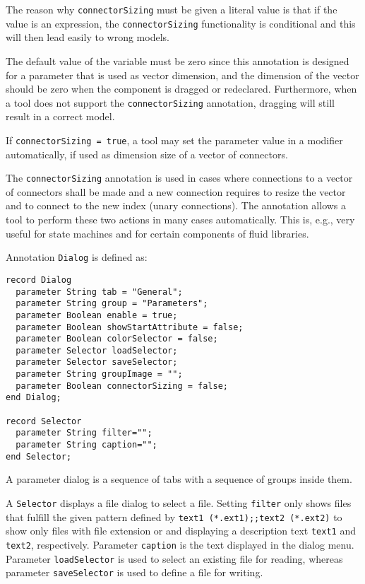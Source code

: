 \begin{nonnormative}
The reason why \lstinline!connectorSizing! must be given a literal value is that if the value is an expression,
the \lstinline!connectorSizing! functionality is conditional and this will then lead easily to wrong models.

The default value of the variable must be zero since this annotation
is designed for a parameter that is used as vector dimension, and the
dimension of the vector should be zero when the component is dragged or
redeclared.  Furthermore, when a tool does not support the
\lstinline!connectorSizing! annotation, dragging will still result in a correct
model.
\end{nonnormative}

If \lstinline!connectorSizing = true!, a tool may set the parameter value
in a modifier automatically, if used as dimension size of a vector of
connectors.

\begin{nonnormative}
The \lstinline!connectorSizing! annotation is used in cases
where connections to a vector of connectors shall be made and a new
connection requires to resize the vector and to connect to the new index
(unary connections). The annotation allows a tool to perform these two
actions in many cases automatically. This is, e.g., very useful for
state machines and for certain components of fluid libraries.
\end{nonnormative}

Annotation \lstinline!Dialog! is defined as:
\begin{lstlisting}[language=modelica]
record Dialog
  parameter String tab = "General";
  parameter String group = "Parameters";
  parameter Boolean enable = true;
  parameter Boolean showStartAttribute = false;
  parameter Boolean colorSelector = false;
  parameter Selector loadSelector;
  parameter Selector saveSelector;
  parameter String groupImage = "";
  parameter Boolean connectorSizing = false;
end Dialog;

record Selector
  parameter String filter="";
  parameter String caption="";
end Selector;
\end{lstlisting}
A parameter dialog is a sequence of tabs with a sequence of groups
inside them.

A \lstinline!Selector! displays a file dialog to select a file. Setting \lstinline!filter! only
shows files that fulfill the given pattern defined by \lstinline!text1 (*.ext1);;text2 (*.ext2)! to show only files with file extension
 or  and displaying a description text \lstinline!text1! and
\lstinline!text2!, respectively. Parameter \lstinline!caption! is the text displayed in the
dialog menu. Parameter \lstinline!loadSelector! is used to select an existing file
for reading, whereas parameter \lstinline!saveSelector! is used to define a file for
writing.

